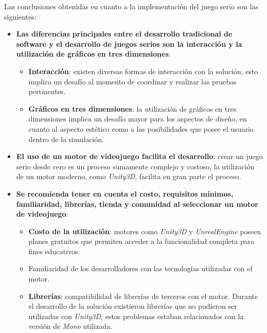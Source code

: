 Las conclusiones obtenidas en cuanto a la implementación del juego serio son las 
siguientes:

\begin{itemize}

\item \textbf{Las diferencias principales entre el desarrollo tradicional de software 
        y el desarrollo de juegos serios son la interacción y la utilización de
        gráficos en tres dimensiones}: 

    \begin{itemize}

    \item \textbf{Interacción}: existen diversas formas de interacción con la
        solución, esto implica un desafío al momento de coordinar y realizar las
        pruebas pertinentes.

    \item \textbf{Gráficos en tres dimensiones}: la utilización de gráficos en
        tres dimensiones implica un desafío mayor para los aspectos de diseño,
        en cuanto al aspecto estético como a las posibilidades que posee el
        usuario dentro de la simulación.

    \end{itemize}

\item \textbf{El uso de un motor de videojuego facilita el desarrollo}: crear
    un juego serio desde cero es un proceso sumamente complejo y costoso, la
    utilización de un motor moderno, como \emph{Unity3D}, facilita en gran parte
    el proceso. 

\item \textbf{Se recomienda tener en cuenta el costo, requisitos mínimos,
        familiaridad, librerías, tienda y comunidad al seleccionar un motor de
        videojuego}:
        
    \begin{itemize}

    \item \textbf{Costo de la utilización}: motores como \emph{Unity3D} y
    	\emph{UnrealEngine} poseen planes gratuitos que permiten acceder a 
        la funcionalidad completa para fines educativos.

    \item Familiaridad de los desarrolladores con las tecnologías
        utilizadas con el motor.

    \item \textbf{Librerías}: compatibilidad de librerías de terceros con el
        motor. Durante el desarrollo de la solución existieron librerías que no
        pudieron ser utilizadas con \emph{Unity3D}, estos problemas estaban
        relacionados con la versión de \emph{Mono} utilizada.


\end{itemize}
\end{itemize}
